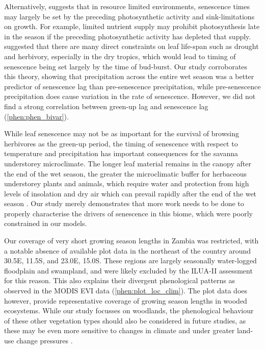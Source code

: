 \begin{refsection}
Alternatively, \citet{Zani2020} suggests that in resource limited environments, senescence times may largely be set by the preceding photosynthetic activity and sink-limitations on growth. For example, limited nutrient supply may prohibit photosynthesis late in the season if the preceding photosynthetic activity has depleted that supply. \citet{Reich1992} suggested that there are many direct constraints on leaf life-span such as drought and herbivory, especially in the dry tropics, which would lead to timing of senescence being set largely by the time of bud-burst. Our study corroborates this theory, showing that precipitation across the entire wet season was a better predictor of senescence lag than pre-senescence precipitation, while pre-senescence precipitation does cause variation in the rate of senescence. However, we did not find a strong correlation between green-up lag and senescence lag (\autoref{phen:phen_bivar}).

While leaf senescence may not be as important for the survival of browsing herbivores as the green-up period, the timing of senescence with respect to temperature and precipitation has important consequences for the savanna understorey microclimate. The longer leaf material remains in the canopy after the end of the wet season, the greater the microclimatic buffer for herbaceous understorey plants and animals, which require water and protection from high levels of insolation and dry air which can prevail rapidly after the end of the wet season \citep{Guan2014}. Our study merely demonstrates that more work needs to be done to properly characterise the drivers of senescence in this biome, which were poorly constrained in our models.

Our coverage of very short growing season lengths in Zambia was restricted, with a notable absence of available plot data in the northeast of the country around 30.5\textdegree{}E, 11.5\textdegree{}S, and 23.0\textdegree{}E, 15.0\textdegree{}S. These regions are largely seasonally water-logged floodplain and swampland, and were likely excluded by the ILUA-II assessment for this reason. This also explains their divergent phenological patterns as observed in the MODIS EVI data (\autoref{phen:plot_loc_clim}). The plot data does however, provide representative coverage of growing season lengths in wooded ecosystems. While our study focusses on woodlands, the phenological behaviour of these other vegetation types should also be considered in future studies, as these may be even more sensitive to changes in climate \citep{Dean2018} and under greater land-use change pressures \citep{Langan2018}.


\end{refsection}
